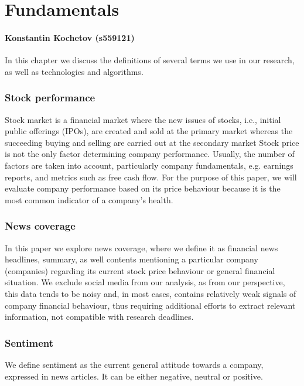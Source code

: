 \chapter{Fundamentals}
\subsubsection*{Konstantin Kochetov (s559121)}
\label{cha:fundamentals}

In this chapter we discuss the definitions of several terms we use in our research, as well as technologies and algorithms.

\subsection{Stock performance}
\label{cha:stock-performance}
Stock market is a financial market where the new issues of stocks, i.e., initial public offerings (IPOs), are created and sold at the primary market whereas the succeeding buying and selling are carried out at the secondary market \cite{Fusionin7:online}
Stock price is not the only factor determining company performance. Usually, the number of factors are taken into account, particularly company fundamentals, e.g. earnings reports, and metrics such as free cash flow.
For the purpose of this paper, we will evaluate company performance based on its price behaviour because it is the most common indicator of a company's health.
\subsection{News coverage}
\label{cha:news-coverage}
In this paper we explore news coverage, where we define it as financial news headlines, summary, as well contents mentioning a particular company (companies) regarding its current stock price behaviour or general financial situation.
We exclude social media from our analysis, as from our perspective, this data tends to be noisy and, in most cases, contains relatively weak signals of company financial behaviour, thus requiring additional efforts to extract relevant information, not compatible with research deadlines.

\subsection{Sentiment}
\label{cha:sentiment}
We define sentiment as the current general attitude towards a company, expressed in news articles. It can be either negative, neutral or positive.


